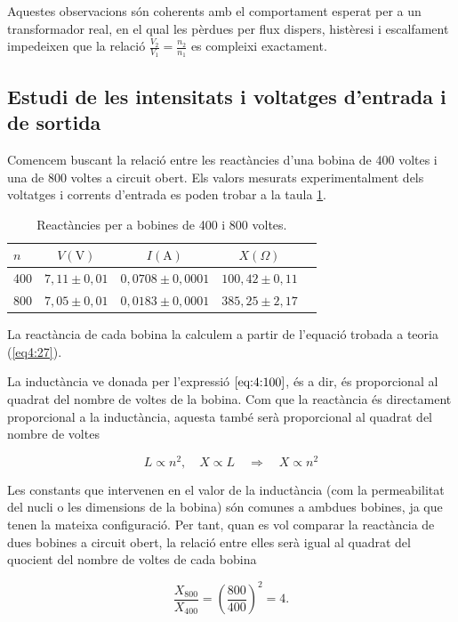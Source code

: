 \documentclass[a4paper,10.5pt]{report}
\begin{document}
Aquestes observacions són coherents amb el comportament esperat per a un transformador real, en el qual les pèrdues per flux dispers, histèresi i escalfament impedeixen que la relació \( \frac{V_2}{V_1} = \frac{n_2}{n_1} \) es compleixi exactament.

\subsection{Estudi de les intensitats i voltatges d'entrada i de sortida}
Comencem buscant la relació entre les reactàncies d'una bobina de 400 voltes i una de 800 voltes a circuit obert. Els valors mesurats experimentalment dels voltatges i corrents d'entrada es poden trobar a la taula \ref{tab:4.3}. 

\begin{table}[H]
	\centering
	\renewcommand{\arraystretch}{1.2}
	\caption{Reactàncies per a bobines de 400 i 800 voltes.}
	\begin{tabular}{lcccc}
		\toprule
		$n$ & $V (\text{V})$ & $I (\text{A})$ & $X(\Omega)$ \\
		\midrule
		400 & $7{,}11 \pm 0{,}01$ & $0{,}0708 \pm 0{,}0001$ & $100{,}42 \pm 0{,}11$ \\
		800 & $7{,}05 \pm 0{,}01$ & $0{,}0183 \pm 0{,}0001$ & $385{,}25 \pm 2{,}17$ \\
		\bottomrule
	\end{tabular}
	\label{tab:4.3}
\end{table}
La reactància de cada bobina la calculem a partir de l'equació trobada a teoria (\ref{eq4:27}).

La inductància ve donada per l'expressió $\ref{eq:4:100}$, és a dir, és proporcional al quadrat del nombre de voltes de la bobina. Com que la reactància és directament proporcional a la inductància, aquesta també serà proporcional al quadrat del nombre de voltes

\begin{equation}
	L \propto n^2, \quad X \propto L \quad \Rightarrow \quad X \propto n^2
\end{equation}

Les constants que intervenen en el valor de la inductància (com la permeabilitat del nucli o les dimensions de la bobina) són comunes a ambdues bobines, ja que tenen la mateixa configuració. Per tant, quan es vol comparar la reactància de dues bobines a circuit obert, la relació entre elles serà igual al quadrat del quocient del nombre de voltes de cada bobina

\begin{equation}
	\frac{X_{800}}{X_{400}} = \left( \frac{800}{400} \right)^2 = 4. \label{eq:4.30}
\end{equation}
\end{document}
